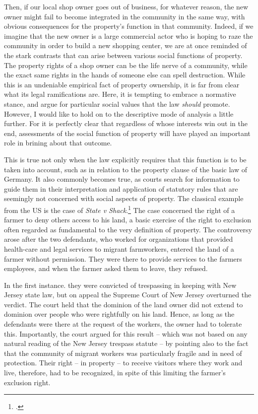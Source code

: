 \documentclass[12pt,a4paper]{book} %
\begin{document}
Then, if our local shop owner goes out of business, for whatever reason, the new owner might fail to become integrated in the community in the same way, with obvious consequences for the property's function in that community. Indeed, if we imagine that the new owner is a large commercial actor who is hoping to raze the community in order to build a new shopping center, we are at once reminded of the stark contrasts that can arise between various social functions of property. The property rights of a shop owner can be the life nerve of a community, while the exact same rights in the hands of someone else can spell destruction. While this is an undeniable empirical fact of property ownership, it is far from clear what its legal ramifications are. Here, it is tempting to embrace a normative stance, and argue for particular social values that the law {\it should} promote. However, I would like to hold on to the descriptive mode of analysis a little further. For it is perfectly clear that regardless of whose interests win out in the end, assessments of the social function of property will have played an important role in brining about that outcome.

This is true not only when the law explicitly requires that this function is to be taken into account, such as in relation to the property clause of the basic law of Germany. It also commonly becomes true, as courts search for information to guide them in their interpretation and application of statutory rules that are seemingly not concerned with social aspects of property. The classical example from the US is the case of {\it State v Shack}.\footcite{shack71} The case concerned the right of a farmer to deny others access to his land, a basic exercise of the right to exclusion often regarded as fundamental to the very definition of property. The controversy arose after the two defendants, who worked for organizations that provided health-care and legal services to migrant farmworkers, entered the land of a farmer without permission. They were there to provide services to the farmers employees, and when the farmer asked them to leave, they refused.

In the first instance. they were convicted of trespassing in keeping with New Jersey state law, but on appeal the Supreme Court of New Jersey overturned the verdict. The court held that the dominion of the land owner did not extend to dominion over people who were rightfully on his land. Hence, as long as the defendants were there at the request of the workers, the owner had to tolerate this. Importantly, the court argued for this result -- which was not based on any natural reading of the New Jersey trespass statute -- by pointing also to the fact that the community of migrant workers was particularly fragile and in need of protection. Their right -- in property -- to receive visitors where they work and live, therefore, had to be recognized, in spite of this limiting the farmer's exclusion right.
\end{document}
